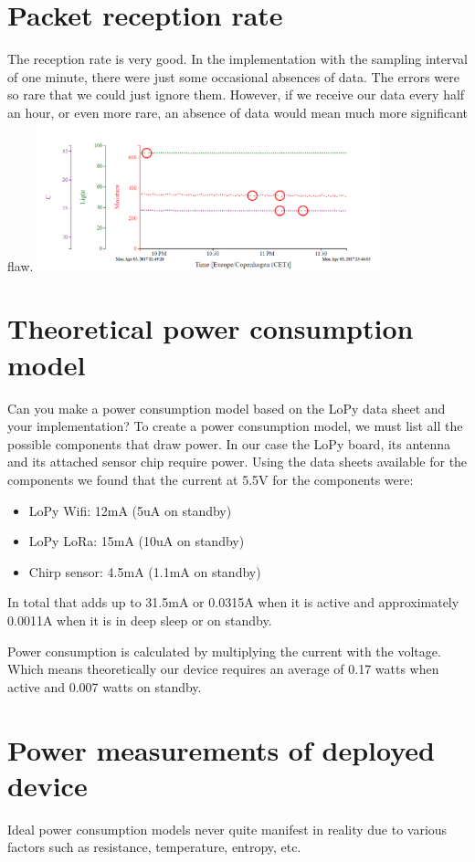 \documentclass[10pt]{sensys-proc}
\begin{document}
\section{Packet reception rate}
The reception rate is very good. In the implementation with the sampling interval of one minute, there were just some occasional absences of data. The errors were so rare that we could just ignore them. However, if we receive our data every half an hour, or even more rare, an absence of data would mean much more significant flaw.
\includegraphics[height=1.7in]{./Images/figure1}
\bigskip
\section{Theoretical power consumption model}
Can you make a power consumption model based on the LoPy data sheet and
your implementation?
To create a power consumption model, we must list all the possible components that draw power. In our case  the LoPy board, its antenna and its attached sensor chip require power. Using the data sheets available for the components we found that the current at 5.5V for the components were:
\begin{itemize}
  \item LoPy Wifi: 12mA (5uA on standby)
  \item LoPy LoRa: 15mA (10uA on standby)
  \item Chirp sensor: 4.5mA (1.1mA on standby) 
\end{itemize}

In total that adds up to 31.5mA or 0.0315A when it is active and approximately 0.0011A when it is in deep sleep or on standby. 

Power consumption is calculated by multiplying the current with the voltage.
 Which means theoretically our device requires an average of 0.17 watts when active and 0.007 watts on standby.
\bigskip
\section{Power measurements of deployed device}
Ideal power consumption models never quite manifest in reality due to various factors such as resistance, temperature, entropy, etc. 
\end{document}
